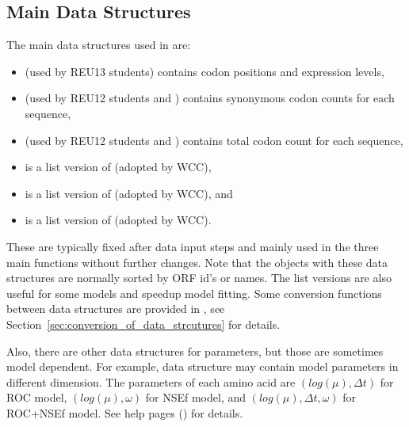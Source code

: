 \subsection[Main Data Structures]{Main Data Structures}
\label{sec:main_data_structures}

The main data structures used in  are:
\begin{itemize}
\item {} (used by REU13 students)
      contains codon positions and expression levels,
\item {} 
      (used by REU12 students and \citet{Wallace2013})
      contains synonymous codon counts for each sequence,
\item {} 
      (used by REU12 students and \citet{Wallace2013})
      contains total codon count for each sequence,
\item {} is a list version of  (adopted by WCC),
\item {} is a list version of  (adopted by WCC), and
\item {} is a list version of  (adopted by WCC).
\end{itemize}
These are typically fixed after data input steps and
mainly used in the three main functions without further changes.
Note that the objects with these data structures are normally sorted
by ORF id's or names. The list versions are also useful for some models
and speedup model fitting. Some conversion functions between data structures
are provided in , see
Section~\ref{sec:conversion_of_data_strcutures} for details.

Also, there are other data structures for parameters, but those are
sometimes model dependent. For example, data structure  may contain
model parameters in different dimension.
The parameters of each amino acid are
$(log(\mu), \Delta t)$ for ROC model,
$(log(\mu), \omega)$ for NSEf model, and
$(log(\mu), \Delta t, \omega)$ for ROC+NSEf model.
See help pages () for details.

